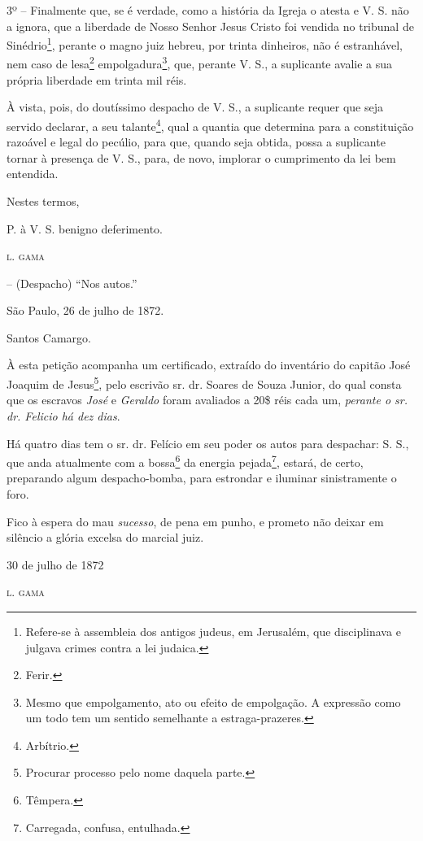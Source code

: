 3º -- Finalmente que, se é verdade, como a história da Igreja o atesta e
V. S. não a ignora, que a liberdade de Nosso Senhor Jesus Cristo foi
vendida no tribunal de Sinédrio\footnote{ Refere-se à assembleia dos
  antigos judeus, em Jerusalém, que disciplinava e julgava crimes contra
  a lei judaica.}, perante o magno juiz hebreu, por trinta dinheiros,
não é estranhável, nem caso de lesa\footnote{ Ferir.}
empolgadura\footnote{ Mesmo que empolgamento, ato ou efeito de
  empolgação. A expressão como um todo tem um sentido semelhante a
  estraga-prazeres.}, que, perante V. S., a suplicante avalie a sua
própria liberdade em trinta mil réis.

À vista, pois, do doutíssimo despacho de V. S., a suplicante requer que
seja servido declarar, a seu talante\footnote{ Arbítrio.}, qual a
quantia que determina para a constituição razoável e legal do pecúlio,
para que, quando seja obtida, possa a suplicante tornar à presença de V.
S., para, de novo, implorar o cumprimento da lei bem entendida.

\begin{flushright}
Nestes termos,

P. à V. S. benigno deferimento.

\textsc{l. gama}
\end{flushright}

-- (Despacho) ``Nos autos.''

São Paulo, 26 de julho de 1872.

Santos Camargo.

À esta petição acompanha um certificado, extraído do inventário do
capitão José Joaquim de Jesus\footnote{ Procurar processo pelo nome
  daquela parte.}, pelo escrivão sr. dr. Soares de Souza Junior, do qual
consta que os escravos \emph{José} e \emph{Geraldo} foram avaliados a
20\$ réis cada um, \emph{perante o sr. dr. Felicio há dez dias}.

\asterisc

Há quatro dias tem o sr. dr. Felício em seu poder os autos para
despachar: S. S., que anda atualmente com a bossa\footnote{ Têmpera.}
da energia pejada\footnote{ Carregada, confusa, entulhada.}, estará, de
certo, preparando algum despacho-bomba, para estrondar e iluminar
sinistramente o foro.

Fico à espera do mau \emph{sucesso}, de pena em punho, e prometo não
deixar em silêncio a glória excelsa do marcial juiz.

\begin{flushright}
30 de julho de 1872

\textsc{l. gama}
\end{flushright}


